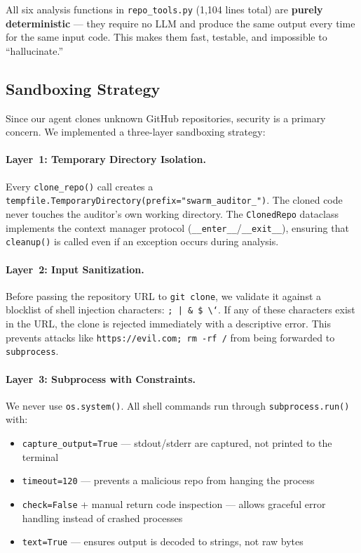 \documentclass[12pt,a4paper]{article}
\begin{document}
All six analysis functions in \texttt{repo\_tools.py} (1,104 lines total) are \textbf{purely deterministic} --- they require no LLM and produce the same output every time for the same input code. This makes them fast, testable, and impossible to ``hallucinate.''


\subsection{Sandboxing Strategy}
\label{sec:sandbox}

Since our agent clones unknown GitHub repositories, security is a primary concern. We implemented a three-layer sandboxing strategy:

\paragraph{Layer~1: Temporary Directory Isolation.}
Every \texttt{clone\_repo()} call creates a \texttt{tempfile.TemporaryDirectory(prefix="swarm\_auditor\_")}. The cloned code never touches the auditor's own working directory. The \texttt{ClonedRepo} dataclass implements the context manager protocol (\texttt{\_\_enter\_\_}/\texttt{\_\_exit\_\_}), ensuring that \texttt{cleanup()} is called even if an exception occurs during analysis.

\paragraph{Layer~2: Input Sanitization.}
Before passing the repository URL to \texttt{git clone}, we validate it against a blocklist of shell injection characters: \texttt{; | \& \$ \textbackslash{}`}. If any of these characters exist in the URL, the clone is rejected immediately with a descriptive error. This prevents attacks like \texttt{https://evil.com; rm -rf /} from being forwarded to \texttt{subprocess}.

\paragraph{Layer~3: Subprocess with Constraints.}
We never use \texttt{os.system()}. All shell commands run through \texttt{subprocess.run()} with:
\begin{itemize}[nosep]
  \item \texttt{capture\_output=True} --- stdout/stderr are captured, not printed to the terminal
  \item \texttt{timeout=120} --- prevents a malicious repo from hanging the process
  \item \texttt{check=False} + manual return code inspection --- allows graceful error handling instead of crashed processes
  \item \texttt{text=True} --- ensures output is decoded to strings, not raw bytes
\end{itemize}
\end{document}
